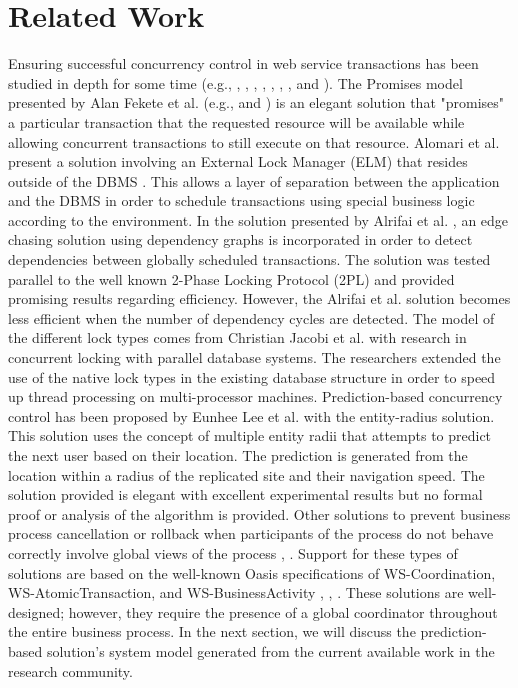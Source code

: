 \section{Related Work}
\label{pbs:related_work}

Ensuring successful concurrency control in web service transactions has been studied in depth for some time (e.g., \cite{Fekete_Promises}, \cite{Fekete_IsolationSupport}, \cite{Alrifai_Distributed_Managment}, \cite{dai_qos-driven_2009}, \cite{zhengdong_gao_combining_2005}, \cite{ferreira_transactional_2012}, \cite{kang-woo_lee_consistency_2000}, and \cite{olmsted_long_2015}). The Promises model presented by Alan Fekete et al. (e.g., \cite{Fekete_Promises} and \cite{Fekete_IsolationSupport}) is an elegant solution that "promises" a particular transaction that the requested resource will be available while allowing concurrent transactions to still execute on that resource. Alomari et al. present a solution involving an External Lock Manager (ELM) that resides outside of the DBMS \cite{Fekete_SnapshotIso}. This allows a layer of separation between the application and the DBMS in order to schedule transactions using special business logic according to the environment. In the solution presented by Alrifai et al. \cite{Alrifai_Distributed_Managment}, an edge chasing solution using dependency graphs is incorporated in order to detect dependencies between globally scheduled transactions. The solution was tested parallel to the well known 2-Phase Locking Protocol (2PL) and provided promising results regarding efficiency. However, the Alrifai et al. solution becomes less efficient when the number of dependency cycles are detected. The model of the different lock types comes from Christian Jacobi et al. \cite{Jacobi_Locking} with research in concurrent locking with parallel database systems. The researchers extended the use of the native lock types in the existing database structure in order to speed up thread processing on multi-processor machines. Prediction-based concurrency control has been proposed by Eunhee Lee et al. \cite{Eunhee_PredictionBasedCC} with the entity-radius solution. This solution uses the concept of multiple entity radii that attempts to predict the next user based on their location. The prediction is generated from the location within a radius of the replicated site and their navigation speed. The solution provided is elegant with excellent experimental results but no formal proof or analysis of the algorithm is provided. Other solutions to prevent business process cancellation or rollback when participants of the process do not behave correctly involve global views of the process \cite{Fekete_RAMP}, \cite{Riegen_RuleBased}. Support for these types of solutions are based on the well-known Oasis specifications of WS-Coordination, WS-AtomicTransaction, and WS-BusinessActivity \cite{WSCO}, \cite{WSAT}, \cite{WSBA}. These solutions are well-designed; however, they require the presence of a global coordinator throughout the entire business process. In the next section, we will discuss the prediction-based solution's system model generated from the current available work in the research community.